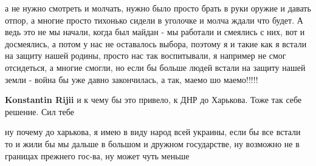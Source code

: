 \begin{cmtlist}
\begin{cmtlist}
а не нужно смотреть и молчать, нужно было просто брать в руки оружие и давать
отпор, а многие просто тихонько сидели в уголочке и молча ждали что будет. А
ведь это не мы начали, когда был майдан - мы работали и смеялись с них, вот и
досмеялись, а потом у нас не оставалось выбора, поэтому я и такие как я встали
на защиту нашей родины, просто нас так воспитывали, я например не смог
отсидеться, а многие смогли, но если бы больше людей встали на защиту нашей
земли - война бы уже давно закончилась, а так, маемо шо маемо!!!!!


 
\textbf{Konstantin Rijii} и к чему бы это привело, к ДНР до Харькова. Тоже так себе решение.
Сил тебе

 

ну почему до харькова, я имею в виду народ всей украины, если бы все встали то
и жили бы мы дальше в большом и дружном государстве, ну возможно не в границах
прежнего гос-ва, ну может чуть меньше
\end{cmtlist}

\end{cmtlist}

